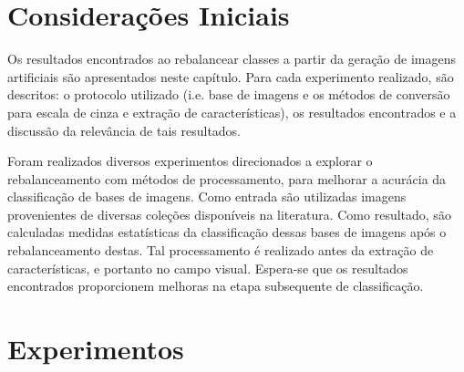 

\section{Considerações Iniciais}

Os resultados encontrados ao rebalancear classes a partir da geração de imagens artificiais são apresentados neste capítulo. Para cada experimento realizado, são descritos: o protocolo utilizado (i.e. base de imagens e os métodos de conversão para escala de cinza e extração de características), os resultados encontrados e a discussão da relevância de tais resultados.

Foram realizados diversos experimentos direcionados a explorar o rebalanceamento com métodos de processamento, para melhorar a acurácia da classificação de bases de imagens. Como entrada são utilizadas imagens provenientes de diversas coleções disponíveis na literatura. Como resultado, são calculadas medidas estatísticas da classificação dessas bases de imagens após o rebalanceamento destas. Tal processamento é realizado antes da extração de características, e portanto no campo visual. Espera-se que os resultados encontrados proporcionem melhoras na etapa subsequente de classificação.



\section{Experimentos}


